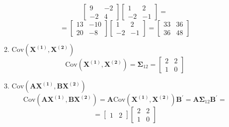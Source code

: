 \begin{enumerate}[font=\bfseries]
\begin{enumerate}
\[\begin{bmatrix}
                    9 & -2 \\
                    -2 & 4
                \end{bmatrix}
                \begin{bmatrix}
                    1 & 2 \\
                    -2 & -1
                \end{bmatrix}
                =
            \]
            \[
                =
                \begin{bmatrix}
                    13 & -10 \\
                    20 & -8
                \end{bmatrix}
                \begin{bmatrix}
                    1 & 2 \\
                    -2 & -1
                \end{bmatrix}
                = 
                \begin{bmatrix}
                    33 & 36 \\
                    36 & 48
                \end{bmatrix}
            \]
            \item $\text{Cov}\left(\mathbf{X^{(1)}}, \mathbf{X^{(2)}}\right)$
            \[
                \text{Cov}\left(\mathbf{X^{(1)}}, \mathbf{X^{(2)}}\right)
                =
                \mathbf{\Sigma}_{12}
                =
                \begin{bmatrix}
                    2 & 2 \\
                    1 & 0
                \end{bmatrix}
            \]
            \item $\text{Cov}\left(\mathbf{A}\mathbf{X^{(1)}}, \mathbf{B}\mathbf{X^{(2)}}\right)$
            \[
                \text{Cov}\left(\mathbf{A}\mathbf{X^{(1)}}, \mathbf{B}\mathbf{X^{(2)}}\right)
                =
                \mathbf{A}\text{Cov}\left(\mathbf{X^{(1)}}, \mathbf{X^{(2)}}\right)\mathbf{B}^\prime
                =
                \mathbf{A}\mathbf{\Sigma}_{12}\mathbf{B}^\prime
                =
            \]
            \[
                =
                \begin{bmatrix}
                    1 & 2
                \end{bmatrix}
                \begin{bmatrix}
                    2 & 2 \\
                    1 & 0

\end{bmatrix}\]
\end{enumerate}
\end{enumerate}
